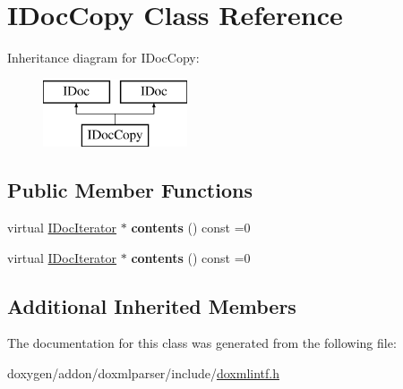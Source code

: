 \hypertarget{class_i_doc_copy}{}\section{I\+Doc\+Copy Class Reference}
\label{class_i_doc_copy}
Inheritance diagram for I\+Doc\+Copy\+:\begin{figure}[H]
\begin{center}
\leavevmode
\includegraphics[height=2.000000cm]{class_i_doc_copy}
\end{center}
\end{figure}
\subsection*{Public Member Functions}
\begin{DoxyCompactItemize}
\item 
\mbox{\label{class_i_doc_copy_a4fd1a6ebaa8775c2ab0ddd61dfa9b06b}} 
virtual \mbox{\hyperlink{class_i_doc_iterator}{I\+Doc\+Iterator}} $\ast$ {\bfseries contents} () const =0
\item 
\mbox{\label{class_i_doc_copy_a4fd1a6ebaa8775c2ab0ddd61dfa9b06b}} 
virtual \mbox{\hyperlink{class_i_doc_iterator}{I\+Doc\+Iterator}} $\ast$ {\bfseries contents} () const =0
\end{DoxyCompactItemize}
\subsection*{Additional Inherited Members}


The documentation for this class was generated from the following file\+:\begin{DoxyCompactItemize}
\item 
doxygen/addon/doxmlparser/include/\mbox{\hyperlink{include_2doxmlintf_8h}{doxmlintf.\+h}}\end{DoxyCompactItemize}
